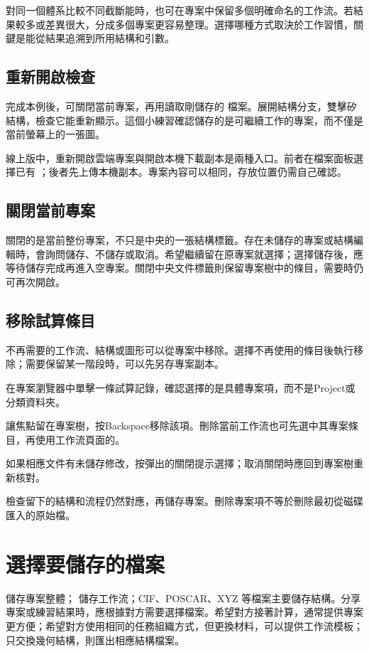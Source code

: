 對同一個體系比較不同截斷能時，也可在專案中保留多個明確命名的工作流。若結果較多或差異很大，分成多個專案更容易整理。選擇哪種方式取決於工作習慣，關鍵是能從結果追溯到所用結構和引數。

\subsection{重新開啟檢查}
完成本例後，可關閉當前專案，再用讀取剛儲存的  檔案。展開結構分支，雙擊矽結構，檢查它能重新顯示。這個小練習確認儲存的是可繼續工作的專案，而不僅是當前螢幕上的一張圖。

線上版中，重新開啟雲端專案與開啟本機下載副本是兩種入口。前者在檔案面板選擇已有 ；後者先上傳本機副本。專案內容可以相同，存放位置仍需自己確認。

\subsection{關閉當前專案}

關閉的是當前整份專案，不只是中央的一張結構標籤。存在未儲存的專案或結構編輯時，會詢問儲存、不儲存或取消。希望繼續留在原專案就選擇；選擇儲存後，應等待儲存完成再進入空專案。關閉中央文件標籤則保留專案樹中的條目，需要時仍可再次開啟。

\subsection{移除試算條目}

不再需要的工作流、結構或圖形可以從專案中移除。選擇不再使用的條目後執行移除；需要保留某一階段時，可以先另存專案副本。

\begin{steps}
\item 在專案瀏覽器中單擊一條試算記錄，確認選擇的是具體專案項，而不是Project或分類資料夾。
\item 讓焦點留在專案樹，按Backspace移除該項。刪除當前工作流也可先選中其專案條目，再使用工作流頁面的。
\item 如果相應文件有未儲存修改，按彈出的關閉提示選擇；取消關閉時應回到專案樹重新核對。
\item 檢查留下的結構和流程仍然對應，再儲存專案。刪除專案項不等於刪除最初從磁碟匯入的原始檔。
\end{steps}


\section{選擇要儲存的檔案}
 儲存專案整體； 儲存工作流；CIF、POSCAR、XYZ 等檔案主要儲存結構。分享專案或練習結果時，應根據對方需要選擇檔案。希望對方接著計算，通常提供專案更方便；希望對方使用相同的任務組織方式，但更換材料，可以提供工作流模板；只交換幾何結構，則匯出相應結構檔案。

